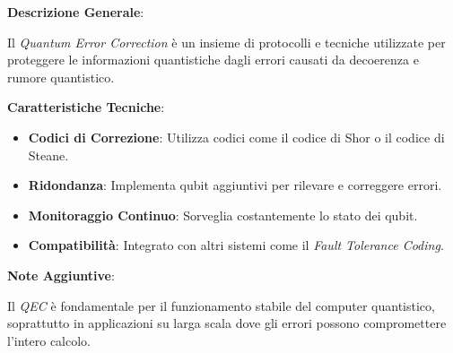 \begin{tcolorbox}[colback=white,colframe=black,title=\textbf{Quantum Error Correction (QEC)}]
\begin{multicols}{2}
\textbf{Descrizione Generale}:

Il \emph{Quantum Error Correction} è un insieme di protocolli e tecniche utilizzate per proteggere le informazioni quantistiche dagli errori causati da decoerenza e rumore quantistico.

\textbf{Caratteristiche Tecniche}:
\begin{itemize}
    \item \textbf{Codici di Correzione}: Utilizza codici come il codice di Shor o il codice di Steane.
    \item \textbf{Ridondanza}: Implementa qubit aggiuntivi per rilevare e correggere errori.
    \item \textbf{Monitoraggio Continuo}: Sorveglia costantemente lo stato dei qubit.
    \item \textbf{Compatibilità}: Integrato con altri sistemi come il \emph{Fault Tolerance Coding}.
\end{itemize}

\textbf{Note Aggiuntive}:

Il \emph{QEC} è fondamentale per il funzionamento stabile del computer quantistico, soprattutto in applicazioni su larga scala dove gli errori possono compromettere l'intero calcolo.

\end{multicols}
\end{tcolorbox}

\vspace{0.5cm}

